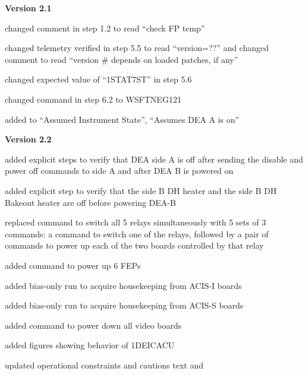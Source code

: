 \documentclass[11pt]{article}
\begin{document}
\item {\bf Version 2.1}
\bi
\item changed comment in step 1.2 to read ``check FP temp''
\item changed telemetry verified in step 5.5 to read ``version=??''
  and changed comment to read ``version \# depends on loaded patches,
  if any''
\item changed expected value of ``1STAT7ST'' in step 5.6
\item changed command in step 6.2 to WSFTNEG121
\item added to ``Assumed Instrument State'', ``Assumes DEA A is on''
\ei

\item {\bf Version 2.2}
\bi
\item added explicit steps to verify that DEA side A is off after sending the
disable and power off commands to side A and after DEA B is powered on
\item added explicit step to verify that the side B DH heater and the side B 
DH Bakeout heater are off before powering DEA-B
\item replaced command to switch all 5 relays simultaneously with 5 sets of 3 
commands: a command to switch one of the relays, followed by a pair of commands
to power up each of the two boards controlled by that relay
\item added command to power up 6 FEPs
\item added bias-only run to acquire housekeeping from ACIS-I boards
\item added bias-only run to acquire housekeeping from ACIS-S boards
\item added command to power down all video boards
\item added figures showing behavior of 1DEICACU
\item updated operational constraints and cautions text
and 
\ei
\ed
\end{document}
